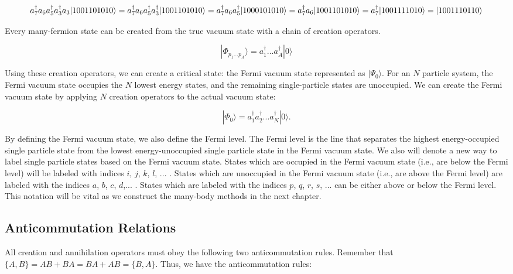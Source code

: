 	\begin{equation}
		a^\dagger_7a_6a^\dagger_5a^\dagger_3a_3|1001101010\rangle\newline
		= a^\dagger_7a_6a^\dagger_5a^\dagger_3|1001101010\rangle \newline
		= a^\dagger_7a_6a^\dagger_5|1000101010\rangle  \newline
		= a^\dagger_7a_6|1001101010\rangle\newline
		= a^\dagger_7|1001111010\rangle \newline
		= |1001110110\rangle \newline
	\end{equation}

	Every many-fermion state can be created from the true vacuum state with a chain of creation operators.

	\begin{equation}
		|\Phi_{p_1...p_A}\rangle = a^\dagger_1...a^\dagger_A|0\rangle
	\end{equation}

	Using these creation operators, we can create a critical state: the Fermi vacuum state represented as $|\Psi_0\rangle$. For an $N$ particle system, the Fermi vacuum state occupies the $N$ lowest energy states, and the remaining single-particle states are unoccupied. We can create the Fermi vacuum state by applying $N$ creation operators to the actual vacuum state:

	\begin{equation}
		|\Phi_0\rangle = a^\dagger_1 a^\dagger_2...a^\dagger_N |0\rangle.
	\end{equation}

	By defining the Fermi vacuum state, we also define the Fermi level. The Fermi level is the line that separates the highest energy-occupied single particle state from the lowest energy-unoccupied single particle state in the Fermi vacuum state. We also will denote a new way to label single particle states based on the Fermi vacuum state. States which are occupied in the Fermi vacuum state (i.e., are below the Fermi level) will be labeled with indices $i$, $j$, $k$, $l$, ... . States which are unoccupied in the Fermi vacuum state (i.e., are above the Fermi level) are labeled with the indices $a$, $b$, $c$, $d$,... .  States which are labeled with the indices $p$, $q$, $r$, $s$, ... can be either above or below the Fermi level. This notation will be vital as we construct the many-body methods in the next chapter.

	\subsection*{Anticommutation Relations}
	All creation and annihilation operators must obey the following two anticommutation rules.  Remember that $\{A,B\} = AB + BA = BA + AB = \{B,A\}.$ Thus, we have the anticommutation rules:

